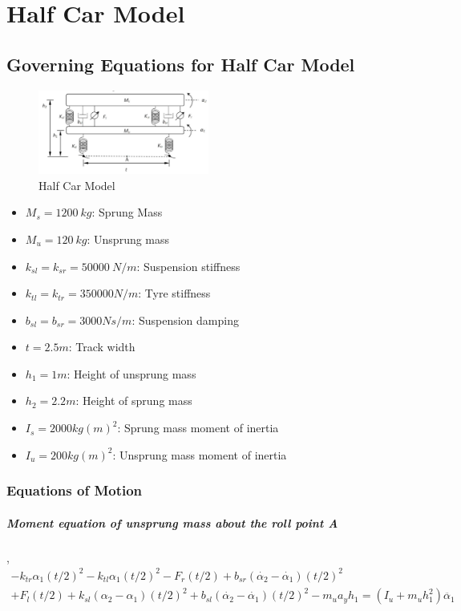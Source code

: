 \documentclass[12pt, a4paper, oneside]{report}
\begin{document}
\chapter{Half Car Model}

\section{Governing Equations for Half Car Model}

\begin{figure}[h]
    \centering
    \includegraphics[width=0.5\textwidth]{images/Q4_halfcar_model.png}
    \caption{Half Car Model}
    \label{fig: half_car_model}
\end{figure}

\begin{itemize}
    \item  $M_s = \qty{1200}{kg}$: Sprung Mass
    \item $M_u = \qty{120}{ kg}$: Unsprung mass
    \item $k_{sl} = k_{sr} = \qty{50000}{N/m} $: Suspension stiffness
    \item $k_{tl} = k_{tr} = 350000 N/m$: Tyre stiffness
    \item $b_{sl} = b_{sr} = 3000 Ns/m$: Suspension damping 
    \item $t = 2.5m $: Track width
    \item $h_1 = 1 m $: Height of unsprung mass
    \item $h_2 = 2.2 m $: Height of sprung mass
    \item $I_s = 2000 kg (m)^2$: Sprung mass moment of inertia
    \item $I_u = 200 kg (m)^2$: Unsprung mass moment of inertia
\end{itemize}

\subsection{Equations of Motion}

\paragraph{Moment equation of unsprung mass about the roll point A},
\begin{multline}
        -k_{tr}\alpha_1 (t/2)^2 - k_{tl}\alpha_1 (t/2)^2 - F_{r} (t/2) + b_{sr}(\dot{\alpha_2} - \dot{\alpha_1}) (t/2)^2 \\ 
        + F_{l} (t/2) + k_{sl}(\alpha_2 - \alpha_1) (t/2)^2 + b_{sl}(\dot{\alpha_2} - \dot{\alpha_1})(t/2)^2 - m_u a_y h_1 = (I_u + m_u h_1^2) \ddot{\alpha_1}
\end{multline}
\end{document}

